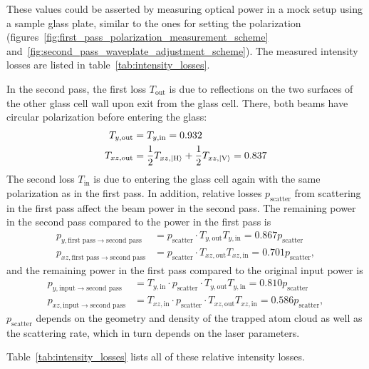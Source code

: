 These values could be asserted by measuring optical power in a mock setup using a sample glass plate, similar to the ones for setting the polarization (figures~\ref{fig:first_pass_polarization_measurement_scheme} and~\ref{fig:second_pass_waveplate_adjustment_scheme}). The measured intensity losses are listed in table~\ref{tab:intensity_losses}.

In the second pass, the first loss $T_{\text{out}}$ is due to reflections on the two surfaces of the other glass cell wall upon exit from the glass cell. There, both beams have circular polarization before entering the glass:
\begin{align}
    T_{y, \text{out}} &= T_{y, \text{in}} = 0.932 \\
    T_{xz, \text{out}} &= \frac{1}{2} T_{xz, \Ket{\text{H}}} + \frac{1}{2} T_{xz, \Ket{\text{V}}} = 0.837
\end{align}
The second loss $T_{\text{in}}$ is due to entering the glass cell again with the same polarization as in the first pass. In addition, relative losses $p_\text{scatter}$ from scattering in the first pass affect the beam power in the second pass. The remaining power in the second pass compared to the power in the first pass is
\begin{align}
    p_{y, \text{first pass} \rightarrow \text{second pass}} &= p_\text{scatter} \cdot T_{y, \text{out}} T_{y, \text{in}}   =  0.867 p_\text{scatter}\\
    p_{xz, \text{first pass} \rightarrow \text{second pass}} &= p_\text{scatter} \cdot T_{xz, \text{out}} T_{xz, \text{in}}   = 0.701 p_\text{scatter},
\end{align}
and the remaining power in the first pass compared to the original input power is
\begin{align}
    p_{y, \text{input} \rightarrow \text{second pass}} &= T_{y, \text{in}} \cdot p_\text{scatter} \cdot T_{y, \text{out}} T_{y, \text{in}} =  0.810 p_\text{scatter} \\
    p_{xz, \text{input} \rightarrow \text{second pass}} &= T_{xz, \text{in}} \cdot p_\text{scatter} \cdot T_{xz, \text{out}} T_{xz, \text{in}} = 0.586 p_\text{scatter},
\end{align}
$p_\text{scatter}$ depends on the geometry and density of the trapped atom cloud as well as the scattering rate, which in turn depends on the laser parameters.

Table~\ref{tab:intensity_losses} lists all of these relative intensity losses.

